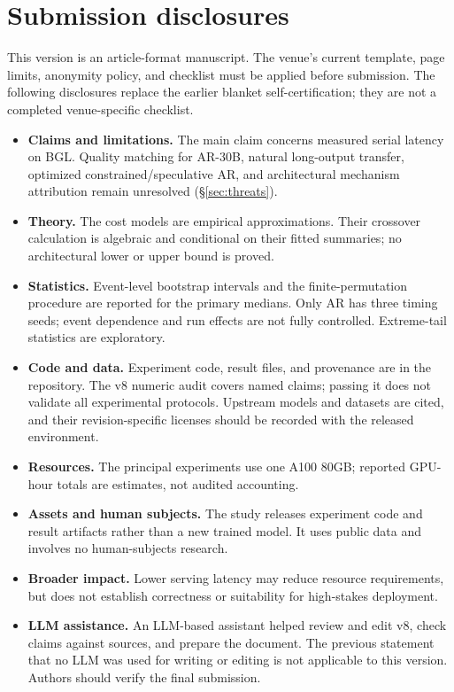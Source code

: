 \section*{Submission disclosures}
\label{app:neurips_checklist}

This version is an article-format manuscript. The venue's current template,
page limits, anonymity policy, and checklist must be applied before
submission. The following disclosures replace the earlier blanket
self-certification; they are not a completed venue-specific checklist.

\begin{itemize}
\item \textbf{Claims and limitations.} The main claim concerns measured
serial latency on BGL. Quality matching for AR-30B, natural long-output
transfer, optimized constrained/speculative AR, and architectural mechanism
attribution remain unresolved (\S\ref{sec:threats}).
\item \textbf{Theory.} The cost models are empirical approximations.
Their crossover calculation is algebraic and conditional on their fitted
summaries; no architectural lower or upper bound is proved.
\item \textbf{Statistics.} Event-level bootstrap intervals and the
finite-permutation procedure are reported for the primary medians.
Only AR has three timing seeds; event dependence and run effects are not
fully controlled. Extreme-tail statistics are exploratory.
\item \textbf{Code and data.} Experiment code, result files, and
provenance are in the repository. The v8 numeric audit covers named claims;
passing it does not validate all experimental protocols. Upstream models
and datasets are cited, and their revision-specific licenses should be
recorded with the released environment.
\item \textbf{Resources.} The principal experiments use one A100 80GB;
reported GPU-hour totals are estimates, not audited accounting.
\item \textbf{Assets and human subjects.} The study releases experiment
code and result artifacts rather than a new trained model. It uses public
data and involves no human-subjects research.
\item \textbf{Broader impact.} Lower serving latency may reduce resource
requirements, but does not establish correctness or suitability for
high-stakes deployment.
\item \textbf{LLM assistance.} An LLM-based assistant helped review and
edit v8, check claims against sources, and prepare the document. The
previous statement that no LLM was used for writing or editing is not
applicable to this version. Authors should verify the final submission.
\end{itemize}
